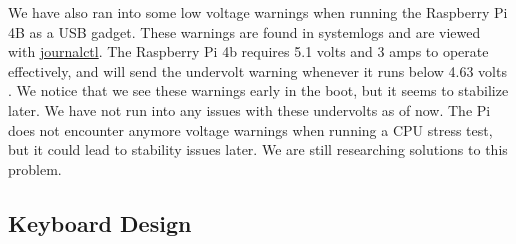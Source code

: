 We have also ran into some low voltage warnings when running the Raspberry Pi 4B as a USB
gadget. These warnings are found in systemlogs and are viewed with \url{journalctl}. The
Raspberry Pi 4b requires 5.1 volts and 3 amps to operate effectively, and will send the
undervolt warning whenever it runs below 4.63 volts
\autocite{raspberryPiAmps}. We notice that we see these warnings early in the boot, but it
seems to stabilize later. We have not run into any issues with these undervolts as of now.
The Pi does not encounter anymore voltage warnings when running a CPU stress test, but it
could lead to stability issues later.  We are still researching  solutions to this
problem.


\subsection{Keyboard Design}

